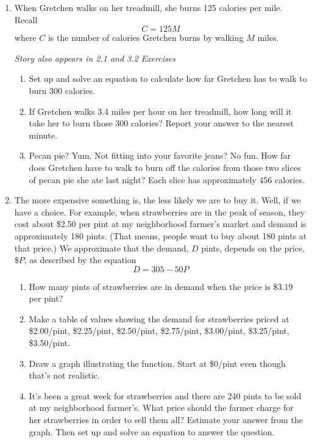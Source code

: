 \begin{enumerate}
\item When Gretchen walks on her treadmill, she burns 125 calories per mile.  Recall $$C=125M$$ where $C$ is the number of calories Gretchen burns by walking $M$ miles. 

 \hfill \emph{Story also appears in 2.1 and 3.2 Exercises}
\begin{enumerate} 
\item Set up and solve an equation to calculate how far Gretchen has to walk to burn 300 calories. 
\item If Gretchen walks 3.4 miles per hour on her treadmill, how long will it take her to burn those 300 calories?  Report your answer to the nearest minute.
\item Pecan pie? Yum.  Not fitting into your favorite jeans?  No fun.   How far does Gretchen have to walk to burn off the calories from those two slices of pecan pie she ate last night?  Each slice has approximately 456 calories.
\end{enumerate} 

\item The more expensive something is, the less likely we are to buy it.  Well, if we have a choice.  For example, when strawberries are in the peak of season, they cost about \$2.50 per pint at my neighborhood farmer's market and demand is approximately 180 pints.  (That means, people want to buy about 180 pints at that price.) We approximate that the demand, $D$ pints, depends on the price, \$$P$, as described by the equation $$D = 305 - 50P$$
\begin{enumerate}
\item How many pints of strawberries are in demand when the price is \$3.19 per pint?
\item Make a table of values showing the demand for strawberries priced at  \$2.00/pint, \$2.25/pint, \$2.50/pint, \$2.75/pint, \$3.00/pint, \$3.25/pint, \$3.50/pint.
\item Draw a graph illustrating the function.  Start at \$0/pint even though that's not realistic.
\item It's been a great week for strawberries and there are 240 pints to be sold at my neighborhood farmer's. What price should the farmer charge for her strawberries in order to sell them all? Estimate your answer from the graph.  Then set up and solve an equation to answer the question.
\end{enumerate}


\end{enumerate}

